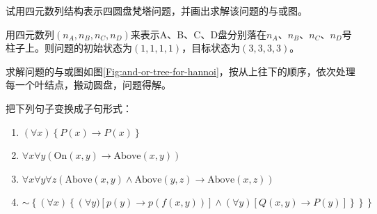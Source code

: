 \begin{question}
试用四元数列结构表示四圆盘梵塔问题，并画出求解该问题的与或图。
\end{question}
\begin{solution}
用四元数列$(n_A, n_B, n_C, n_D)$来表示A、B、C、D盘分别落在$n_A$、$n_B$、$n_C$、$n_D$号柱子上。则问题的初始状态为$(1,1,1,1)$，目标状态为$(3,3,3,3)$。\par
求解问题的与或图如图\ref{Fig:and-or-tree-for-hannoi}，按从上往下的顺序，依次处理每一个叶结点，搬动圆盘，问题得解。
\end{solution}

\begin{question}
把下列句子变换成子句形式：
	\begin{enumerate}
         \item $\left(\forall x\right) \left\{P\left(x\right) \to P\left(x\right)\right\}$
         \item $\forall x \forall y \left(\mathrm{On} \left(x,y\right) \to \mathrm{Above} \left(x,y\right) \right)$
         \item $\forall x \forall y \forall z \left(\mathrm{Above} \left(x,y\right) \wedge \mathrm{Above}\left(y,z\right) \to \mathrm{Above}\left(x,z\right) \right)$ 
         \item $\sim\left\{\left(\forall x\right)\left\{\left(\forall y)\left[p\left(y\right) \to p(f(x,y))\right] \wedge \left(\forall y \right) \left[Q(x,y) \to P(y) \right]\right\}\right\}\right\}$
	\end{enumerate}
\end{question}
